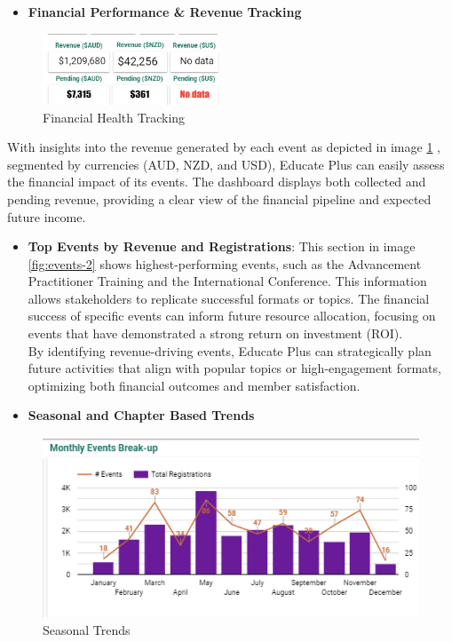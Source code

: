 \documentclass[11pt,a4paper,]{article}
\providecommand{\tightlist}{%
  \setlength{\itemsep}{0pt}\setlength{\parskip}{0pt}}
\begin{document}
\begin{itemize}
\tightlist
\item
  \textbf{Financial Performance \& Revenue Tracking}
\end{itemize}

\begin{figure}[H]

{\centering \includegraphics[width=200px]{Images/finance_tracking} 

}

\caption{Financial Health Tracking}\label{fig:perform}
\end{figure}

With insights into the revenue generated by each event as depicted in image \ref{fig:perform} , segmented by currencies (AUD, NZD, and USD), Educate Plus can easily assess the financial impact of its events. The dashboard displays both collected and pending revenue, providing a clear view of the financial pipeline and expected future income.

\begin{itemize}
\item
  \textbf{Top Events by Revenue and Registrations}: This section in image \ref{fig:events-2} shows highest-performing events, such as the Advancement Practitioner Training and the International Conference. This information allows stakeholders to replicate successful formats or topics. The financial success of specific events can inform future resource allocation, focusing on events that have demonstrated a strong return on investment (ROI).\\
  By identifying revenue-driving events, Educate Plus can strategically plan future activities that align with popular topics or high-engagement formats, optimizing both financial outcomes and member satisfaction.
\item
  \textbf{Seasonal and Chapter Based Trends}
\end{itemize}

\begin{figure}[H]

{\centering \includegraphics[width=0.8\linewidth]{Images/seasonality} 

}

\caption{Seasonal Trends}\label{fig:season-trend}
\end{figure}
\end{document}
